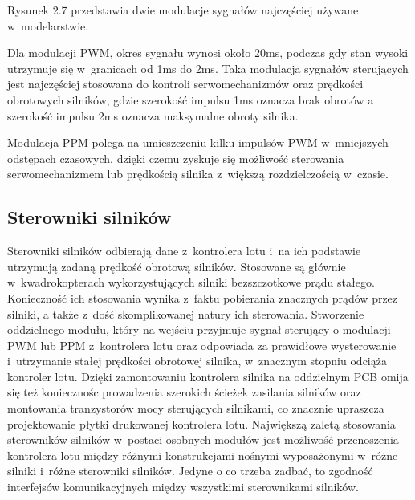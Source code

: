 Rysunek 2.7 przedstawia dwie modulacje sygnałów najczęściej używane w~modelarstwie. 

Dla modulacji PWM, okres sygnału wynosi około 20ms, podczas gdy stan wysoki utrzymuje się w~granicach od 1ms do 2ms. Taka modulacja sygnałów sterujących jest najczęściej stosowana do kontroli serwomechanizmów oraz prędkości obrotowych silników, gdzie szerokość impulsu 1ms oznacza brak obrotów a szerokość impulsu 2ms oznacza maksymalne obroty silnika. 

Modulacja PPM polega na umieszczeniu kilku impulsów PWM w~mniejszych odstępach czasowych, dzięki czemu zyskuje się możliwość sterowania serwomechanizmem lub prędkością silnika z~większą rozdzielczością w~czasie.


\subsection{Sterowniki silników}

Sterowniki silników odbierają dane z~kontrolera lotu i~na ich podstawie utrzymują zadaną prędkość obrotową silników. Stosowane są głównie w~kwadrokopterach wykorzystujących silniki bezszczotkowe prądu stałego. Konieczność ich stosowania wynika z~faktu pobierania znacznych prądów przez silniki, a także z~dość skomplikowanej natury ich sterowania. Stworzenie oddzielnego modułu, który na wejściu przyjmuje sygnał sterujący o modulacji PWM lub PPM z~kontrolera lotu oraz odpowiada za prawidłowe wysterowanie i~utrzymanie stałej prędkości obrotowej silnika, w~znacznym stopniu odciąża kontroler lotu. Dzięki zamontowaniu kontrolera silnika na oddzielnym PCB omija się też koniecznośc prowadzenia szerokich ścieżek zasilania silników oraz montowania tranzystorów mocy sterujących silnikami, co znacznie upraszcza projektowanie płytki drukowanej kontrolera lotu. Największą zaletą stosowania sterowników silników w~postaci osobnych modułów jest możliwość przenoszenia kontrolera lotu między różnymi konstrukcjami nośnymi wyposażonymi w~różne silniki i~różne sterowniki silników. Jedyne o co trzeba zadbać, to zgodność interfejsów komunikacyjnych między wszystkimi sterownikami silników. 

